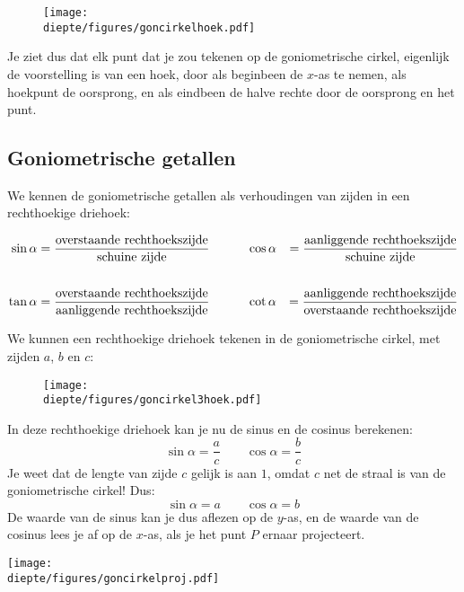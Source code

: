 \documentclass[a4paper,12pt]{article}
\newcommand{\diepte}{./}
\begin{document}
\begin{figure}[h]
\begin{center}
\texttt{[image: \\diepte/figures/goncirkelhoek.pdf]}
\end{center}
\end{figure}

Je ziet dus dat elk punt dat je zou tekenen op de goniometrische cirkel, eigenlijk de voorstelling is van een hoek, door als beginbeen de $x$-as te nemen, als hoekpunt de oorsprong, en als eindbeen de halve rechte door de oorsprong en het punt.

\subsection{Goniometrische getallen}

We kennen de goniometrische getallen als verhoudingen van zijden in een rechthoekige driehoek:

\begin{align*}
\sin \alpha &= \frac{\textup{overstaande rechthoekszijde}}{\textup{schuine zijde}} &\qquad & \cos \alpha &= \frac{\textup{aanliggende rechthoekszijde}}{\textup{schuine zijde}}\\
&&\\
\tan \alpha &= \frac{\textup{overstaande rechthoekszijde}}{\textup{aanliggende rechthoekszijde}}&\qquad &\cot \alpha &= \frac{\textup{aanliggende rechthoekszijde}}{\textup{overstaande rechthoekszijde}}\\
\end{align*}

We kunnen een rechthoekige driehoek tekenen in de goniometrische cirkel, met zijden $a$, $b$ en $c$:

\begin{figure}[h]
\begin{center}
\texttt{[image: \\diepte/figures/goncirkel3hoek.pdf]}
\end{center}
\end{figure}

In deze rechthoekige driehoek kan je nu de sinus en de cosinus berekenen:
\[\sin \alpha = \frac{a}{c} \qquad \cos \alpha = \frac{b}{c}\]
Je weet dat de lengte van zijde $c$ gelijk is aan $1$, omdat $c$ net de straal is van de goniometrische cirkel! Dus:
\[\sin \alpha = a \qquad \cos \alpha = b\]
De waarde van de sinus kan je dus aflezen op de $y$-as, en de waarde van de cosinus lees je af op de $x$-as, als je het punt $P$ ernaar projecteert.

\begin{center}
\texttt{[image: \\diepte/figures/goncirkelproj.pdf]}
\end{center}
\end{document}
